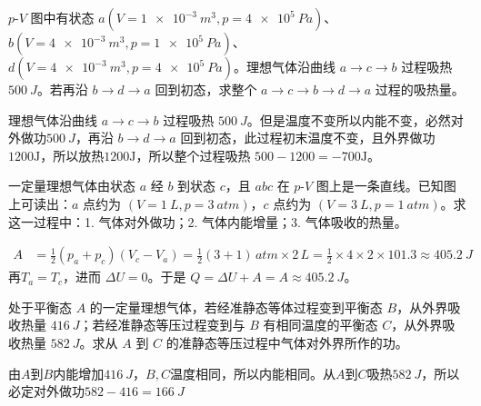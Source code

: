 \begin{exercise}[2015-2016期末：已知一路吸热时怎样求闭合路径吸热]
\(p\)-\(V\) 图中有状态 \(a( V=\SI{1e-3}{m^3},p=\SI{4e5}{Pa})\)、\(b( V=\SI{4e-3}{m^3},p=\SI{1e5}{Pa})\)、\(d( V=\SI{4e-3}{m^3},p=\SI{4e5}{Pa})\)。理想气体沿曲线 \(a\to c\to b\) 过程吸热 \(\SI{500}{J}\)。若再沿 \(b\to d\to a\) 回到初态，求整个 \(a\to c\to b\to d\to a\) 过程的吸热量。
\end{exercise}
\begin{solution}
理想气体沿曲线 \(a\to c\to b\) 过程吸热 \(\SI{500}{J}\)。但是温度不变所以内能不变，必然对外做功\(\SI{500}{J}\)，再沿 \(b\to d\to a\) 回到初态，此过程初末温度不变，且外界做功$1200\text{J}$，所以放热$1200\text{J}$，所以整个过程吸热 \(500-1200=-700\text{J}\)。
\end{solution}

\begin{exercise}[\(p\)-\(V\) 图上一条直线过程为什么能先看面积和温度]
一定量理想气体由状态 \(a\) 经 \(b\) 到状态 \(c\)，且 \(abc\) 在 \(p\)-\(V\) 图上是一条直线。已知图上可读出：\(a\) 点约为 \((V=\SI{1}{L},p=\SI{3}{atm})\)，\(c\) 点约为 \((V=\SI{3}{L},p=\SI{1}{atm})\)。求这一过程中：1. 气体对外做功；2. 气体内能增量；3. 气体吸收的热量。
\end{exercise}

\begin{solution}
\[
\begin{aligned}
A&=\frac12(p_a+p_c)(V_c-V_a)=\frac12(3+1)\,\si{atm}\times 2\,\si{L}=\frac12\times4\times2\times101.3\approx \SI{405.2}{J}
\end{aligned}
\]
再\(T_a=T_c\)，进而 \(\Delta U=0\)。于是 \(Q=\Delta U+A=A\approx \SI{405.2}{J}\)。
\end{solution}

\begin{exercise}
处于平衡态 \(A\) 的一定量理想气体，若经准静态等体过程变到平衡态 \(B\)，从外界吸收热量 \(\SI{416}{J}\)；若经准静态等压过程变到与 \(B\) 有相同温度的平衡态 \(C\)，从外界吸收热量 \(\SI{582}{J}\)。求从 \(A\) 到 \(C\) 的准静态等压过程中气体对外界所作的功。
\end{exercise}

\begin{solution}
由$A$到$B$内能增加\(\SI{416}{J}\)，$B,C$温度相同，所以内能相同。从$A$到$C$吸热\(\SI{582}{J}\)，所以必定对外做功$582-416 =\SI{166}{J}$ 
\end{solution}
